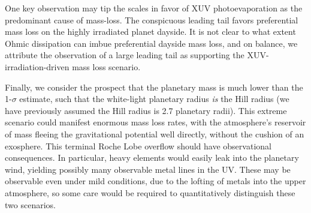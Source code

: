 \documentclass[twocolumn]{aastex631}
\begin{document}
One key observation may tip the scales in favor of XUV photoevaporation as the predominant cause of mass-loss.  The conspicuous leading tail favors preferential mass loss on the highly irradiated planet dayside.  It is not clear to what extent Ohmic dissipation can imbue preferential dayside mass loss, and on balance, we attribute the observation of a large leading tail as supporting the XUV-irradiation-driven mass loss scenario.

Finally, we consider the prospect that the planetary mass is much lower than the 1-$\sigma$ estimate, such that the white-light planetary radius \emph{is} the Hill radius (we have previously assumed the Hill radius is 2.7 planetary radii).  This extreme scenario could manifest enormous mass loss rates, with the atmosphere's reservoir of mass fleeing the gravitational potential well directly, without the cushion of an exosphere.  This terminal Roche Lobe overflow should have observational consequences.  In particular, heavy elements would easily leak into the planetary wind, yielding possibly many observable metal lines in the UV.  These may be observable even under mild conditions, due to the lofting of metals into the upper atmosphere, so some care would be required to quantitatively distinguish these two scenarios.
\end{document}
